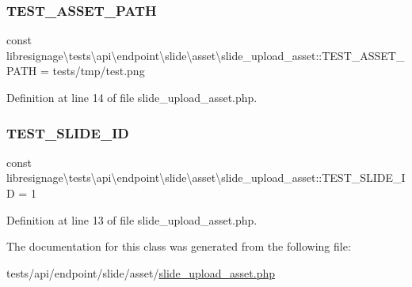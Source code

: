 \subsubsection{\texorpdfstring{T\+E\+S\+T\+\_\+\+A\+S\+S\+E\+T\+\_\+\+P\+A\+TH}{TEST\_ASSET\_PATH}}
{\footnotesize\ttfamily const libresignage\textbackslash{}tests\textbackslash{}api\textbackslash{}endpoint\textbackslash{}slide\textbackslash{}asset\textbackslash{}slide\+\_\+upload\+\_\+asset\+::\+T\+E\+S\+T\+\_\+\+A\+S\+S\+E\+T\+\_\+\+P\+A\+TH = \textquotesingle{}tests/tmp/test.\+png\textquotesingle{}}



Definition at line 14 of file slide\+\_\+upload\+\_\+asset.\+php.

\mbox{\label{classlibresignage_1_1tests_1_1api_1_1endpoint_1_1slide_1_1asset_1_1slide__upload__asset_a426dd2bfbd7fae533dad740a1e0f762c}} 
\subsubsection{\texorpdfstring{T\+E\+S\+T\+\_\+\+S\+L\+I\+D\+E\+\_\+\+ID}{TEST\_SLIDE\_ID}}
{\footnotesize\ttfamily const libresignage\textbackslash{}tests\textbackslash{}api\textbackslash{}endpoint\textbackslash{}slide\textbackslash{}asset\textbackslash{}slide\+\_\+upload\+\_\+asset\+::\+T\+E\+S\+T\+\_\+\+S\+L\+I\+D\+E\+\_\+\+ID = \textquotesingle{}1\textquotesingle{}}



Definition at line 13 of file slide\+\_\+upload\+\_\+asset.\+php.



The documentation for this class was generated from the following file\+:\begin{DoxyCompactItemize}
\item 
tests/api/endpoint/slide/asset/\hyperlink{tests_2api_2endpoint_2slide_2asset_2slide__upload__asset_8php}{slide\+\_\+upload\+\_\+asset.\+php}\end{DoxyCompactItemize}

